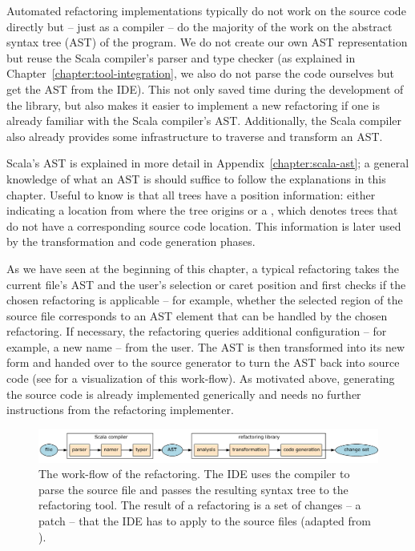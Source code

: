 Automated refactoring implementations typically do not work on the source code directly but -- just as a compiler -- do the majority of the work on the abstract syntax tree (AST) of the program. We do not create our own AST representation but reuse the Scala compiler's parser and type checker (as explained in Chapter~\ref{chapter:tool-integration}, we also do not parse the code ourselves but get the AST from the IDE). This not only saved time during the development of the library, but also makes it easier to implement a new refactoring if one is already familiar with the Scala compiler's AST. Additionally, the Scala compiler also already provides some infrastructure to traverse and transform an AST.

Scala's AST is explained in more detail in Appendix~\vref{chapter:scala-ast}; a general knowledge of what an AST is should suffice to follow the explanations in this chapter. Useful to know is that all trees have a position information: either indicating a location from where the tree origins or a , which denotes trees that do not have a corresponding source code location. This information is later used by the transformation and code generation phases.

As we have seen at the beginning of this chapter, a typical refactoring takes the current file's AST and the user's selection or caret position and first checks if the chosen refactoring is applicable -- for example, whether the selected region of the source file corresponds to an AST element that can be handled by the chosen refactoring. If necessary, the refactoring queries additional configuration -- for example, a new name -- from the user. The AST is then transformed into its new form and handed over to the source generator to turn the AST back into source code (see  for a visualization of this work-flow). As motivated above, generating the source code is already implemented generically and needs no further instructions from the refactoring implementer.

\begin{figure}
  \centering
  \includegraphics[width=\linewidth]{refactoring-flow.pdf}
  \caption{The work-flow of the refactoring. The IDE uses the compiler to parse the source file and passes the resulting syntax tree to the refactoring tool. The result of a refactoring is a set of changes -- a patch -- that the IDE has to apply to the source files (adapted from \cite{ScalaRefactoring}).}
  \label{figure:refactoring-flow}
\end{figure}

